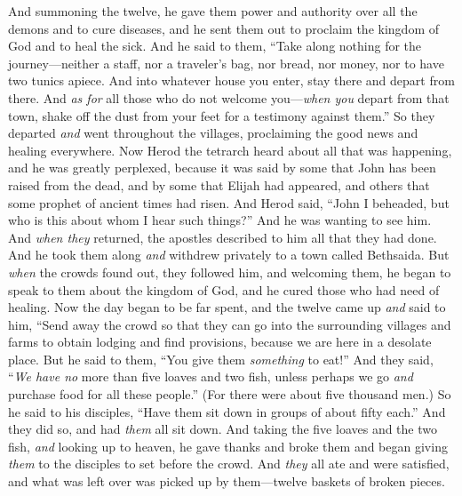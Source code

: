 \begin{biblechapter} %
 And summoning the twelve, he gave them power and authority over all the demons and to cure diseases,
\verse and he sent them out to proclaim the kingdom of God and to heal the sick.
\verse And he said to them, “Take along nothing for the journey—neither a staff, nor a traveler’s bag, nor bread, nor money, nor to have two tunics apiece.
\verse And into whatever house you enter, stay there and depart from there.
\verse And \textit{as for} all those who do not welcome you—\textit{when you} depart from that town, shake off the dust from your feet for a testimony against them.”
\verse So they departed \textit{and} went throughout the villages, proclaiming the good news and healing everywhere.
 Now Herod the tetrarch heard about all that was happening, and he was greatly perplexed, because it was said by some that John has been raised from the dead,
\verse and by some that Elijah had appeared, and others that some prophet of ancient times had risen.
\verse And Herod said, “John I beheaded, but who is this about whom I hear such things?” And he was wanting to see him.
 And \textit{when they} returned, the apostles described to him all that they had done. And he took them along \textit{and} withdrew privately to a town called Bethsaida.
\verse But \textit{when} the crowds found out, they followed him, and welcoming them, he began to speak to them about the kingdom of God, and he cured those who had need of healing.
\verse Now the day began to be far spent, and the twelve came up \textit{and} said to him, “Send away the crowd so that they can go into the surrounding villages and farms to obtain lodging and find provisions, because we are here in a desolate place.
\verse But he said to them, “You give them \textit{something} to eat!” And they said, “\textit{We have no} more than five loaves and two fish, unless perhaps we go \textit{and} purchase food for all these people.”
\verse (For there were about five thousand men.) So he said to his disciples, “Have them sit down in groups of about fifty each.”
\verse And they did so, and had \textit{them} all sit down.
\verse And taking the five loaves and the two fish, \textit{and} looking up to heaven, he gave thanks and broke them and began giving \textit{them} to the disciples to set before the crowd.
\verse And \textit{they} all ate and were satisfied, and what was left over was picked up by them—twelve baskets of broken pieces.

\end{biblechapter}
